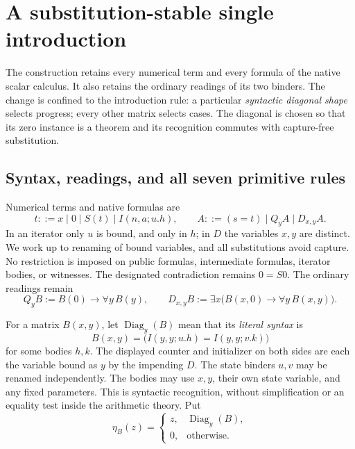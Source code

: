 \section{A substitution-stable single introduction}
\label{sec:diagonal-core}

The construction retains every numerical term and every formula of the
native scalar calculus.  It also retains the ordinary readings of its two
binders.  The change is confined to the introduction rule: a particular
\emph{syntactic diagonal shape} selects progress; every other matrix selects
cases.  The diagonal is chosen so that its zero instance is a theorem and
its recognition commutes with capture-free substitution.

\subsection{Syntax, readings, and all seven primitive rules}

Numerical terms and native formulas are
\[
 t ::= x\mid 0\mid S(t)\mid I(n,a;u.h),
 \qquad
 A ::= (s=t)\mid Q_y A\mid D_{x,y}A.
\]
In an iterator only $u$ is bound, and only in $h$; in $D$ the variables
$x,y$ are distinct.  We work up to renaming of bound variables, and all
substitutions avoid capture.  No restriction is imposed on public formulas,
intermediate formulas, iterator bodies, or witnesses.  The designated
contradiction remains $0=S0$.  The ordinary readings remain
\[
 Q_y B := B(0)\to\forall y\,B(y),\qquad
 D_{x,y}B := \exists x\bigl(B(x,0)\to\forall y\,B(x,y)\bigr).
\]

\begin{definition}
For a matrix $B(x,y)$, let $\operatorname{Diag}_y(B)$ mean that its
\emph{literal syntax} is
\begin{equation}
 B(x,y)=
 \bigl(I(y,y;u.h)=I(y,y;v.k)\bigr)
 \label{eq:diag-shape}
\end{equation}
for some bodies $h,k$.  The displayed counter and initializer on both sides
are each the variable bound as $y$ by the impending $D$.
The state binders $u,v$ may be renamed independently.  The bodies may use
$x,y$, their own state variable, and any fixed parameters.
This is syntactic recognition, without simplification or an equality test
inside the arithmetic theory.  Put
\[
 \eta_B(z)=
 \begin{cases}
 z,&\operatorname{Diag}_y(B),\\
 0,&\text{otherwise}.
 \end{cases}
\]
\end{definition}

